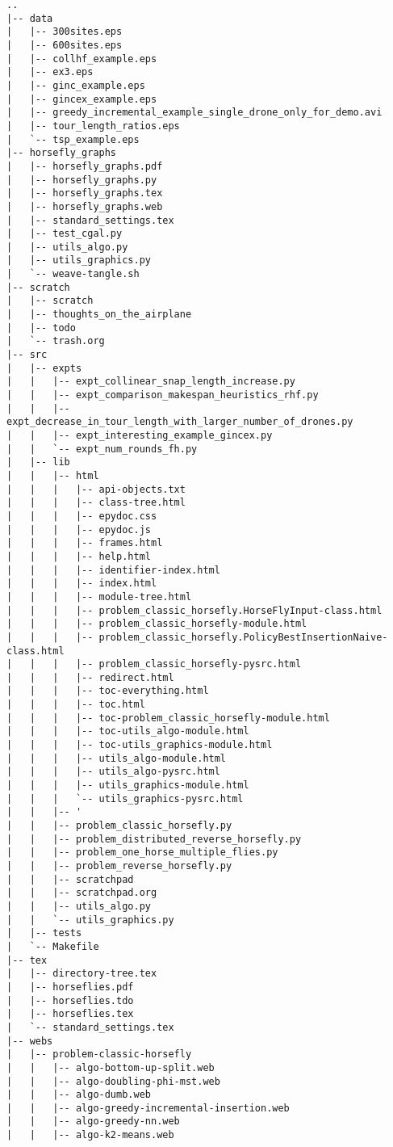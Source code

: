 \begin{verbatim}
..
|-- data
|   |-- 300sites.eps
|   |-- 600sites.eps
|   |-- collhf_example.eps
|   |-- ex3.eps
|   |-- ginc_example.eps
|   |-- gincex_example.eps
|   |-- greedy_incremental_example_single_drone_only_for_demo.avi
|   |-- tour_length_ratios.eps
|   `-- tsp_example.eps
|-- horsefly_graphs
|   |-- horsefly_graphs.pdf
|   |-- horsefly_graphs.py
|   |-- horsefly_graphs.tex
|   |-- horsefly_graphs.web
|   |-- standard_settings.tex
|   |-- test_cgal.py
|   |-- utils_algo.py
|   |-- utils_graphics.py
|   `-- weave-tangle.sh
|-- scratch
|   |-- scratch
|   |-- thoughts_on_the_airplane
|   |-- todo
|   `-- trash.org
|-- src
|   |-- expts
|   |   |-- expt_collinear_snap_length_increase.py
|   |   |-- expt_comparison_makespan_heuristics_rhf.py
|   |   |-- expt_decrease_in_tour_length_with_larger_number_of_drones.py
|   |   |-- expt_interesting_example_gincex.py
|   |   `-- expt_num_rounds_fh.py
|   |-- lib
|   |   |-- html
|   |   |   |-- api-objects.txt
|   |   |   |-- class-tree.html
|   |   |   |-- epydoc.css
|   |   |   |-- epydoc.js
|   |   |   |-- frames.html
|   |   |   |-- help.html
|   |   |   |-- identifier-index.html
|   |   |   |-- index.html
|   |   |   |-- module-tree.html
|   |   |   |-- problem_classic_horsefly.HorseFlyInput-class.html
|   |   |   |-- problem_classic_horsefly-module.html
|   |   |   |-- problem_classic_horsefly.PolicyBestInsertionNaive-class.html
|   |   |   |-- problem_classic_horsefly-pysrc.html
|   |   |   |-- redirect.html
|   |   |   |-- toc-everything.html
|   |   |   |-- toc.html
|   |   |   |-- toc-problem_classic_horsefly-module.html
|   |   |   |-- toc-utils_algo-module.html
|   |   |   |-- toc-utils_graphics-module.html
|   |   |   |-- utils_algo-module.html
|   |   |   |-- utils_algo-pysrc.html
|   |   |   |-- utils_graphics-module.html
|   |   |   `-- utils_graphics-pysrc.html
|   |   |-- '
|   |   |-- problem_classic_horsefly.py
|   |   |-- problem_distributed_reverse_horsefly.py
|   |   |-- problem_one_horse_multiple_flies.py
|   |   |-- problem_reverse_horsefly.py
|   |   |-- scratchpad
|   |   |-- scratchpad.org
|   |   |-- utils_algo.py
|   |   `-- utils_graphics.py
|   |-- tests
|   `-- Makefile
|-- tex
|   |-- directory-tree.tex
|   |-- horseflies.pdf
|   |-- horseflies.tdo
|   |-- horseflies.tex
|   `-- standard_settings.tex
|-- webs
|   |-- problem-classic-horsefly
|   |   |-- algo-bottom-up-split.web
|   |   |-- algo-doubling-phi-mst.web
|   |   |-- algo-dumb.web
|   |   |-- algo-greedy-incremental-insertion.web
|   |   |-- algo-greedy-nn.web
|   |   |-- algo-k2-means.web

\end{verbatim}
